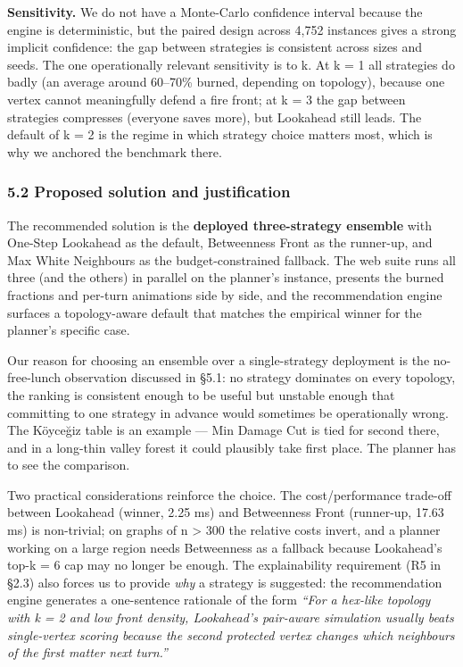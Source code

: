 \documentclass[
  11pt,
]{article}
\begin{document}
\textbf{Sensitivity.} We do not have a Monte-Carlo confidence interval
because the engine is deterministic, but the paired design across 4,752
instances gives a strong implicit confidence: the gap between strategies
is consistent across sizes and seeds. The one operationally relevant
sensitivity is to k. At k = 1 all strategies do badly (an average around
60--70\% burned, depending on topology), because one vertex cannot
meaningfully defend a fire front; at k = 3 the gap between strategies
compresses (everyone saves more), but Lookahead still leads. The default
of k = 2 is the regime in which strategy choice matters most, which is
why we anchored the benchmark there.

\subsubsection{5.2 Proposed solution and
justification}\label{proposed-solution-and-justification}

The recommended solution is the \textbf{deployed three-strategy
ensemble} with One-Step Lookahead as the default, Betweenness Front as
the runner-up, and Max White Neighbours as the budget-constrained
fallback. The web suite runs all three (and the others) in parallel on
the planner's instance, presents the burned fractions and per-turn
animations side by side, and the recommendation engine surfaces a
topology-aware default that matches the empirical winner for the
planner's specific case.

Our reason for choosing an ensemble over a single-strategy deployment is
the no-free-lunch observation discussed in §5.1: no strategy dominates
on every topology, the ranking is consistent enough to be useful but
unstable enough that committing to one strategy in advance would
sometimes be operationally wrong. The Köyceğiz table is an example ---
Min Damage Cut is tied for second there, and in a long-thin valley
forest it could plausibly take first place. The planner has to see the
comparison.

Two practical considerations reinforce the choice. The cost/performance
trade-off between Lookahead (winner, 2.25 ms) and Betweenness Front
(runner-up, 17.63 ms) is non-trivial; on graphs of n \textgreater{} 300
the relative costs invert, and a planner working on a large region needs
Betweenness as a fallback because Lookahead's top-k = 6 cap may no
longer be enough. The explainability requirement (R5 in §2.3) also
forces us to provide \emph{why} a strategy is suggested: the
recommendation engine generates a one-sentence rationale of the form
\emph{``For a hex-like topology with k = 2 and low front density,
Lookahead's pair-aware simulation usually beats single-vertex scoring
because the second protected vertex changes which neighbours of the
first matter next turn.''}
\end{document}
